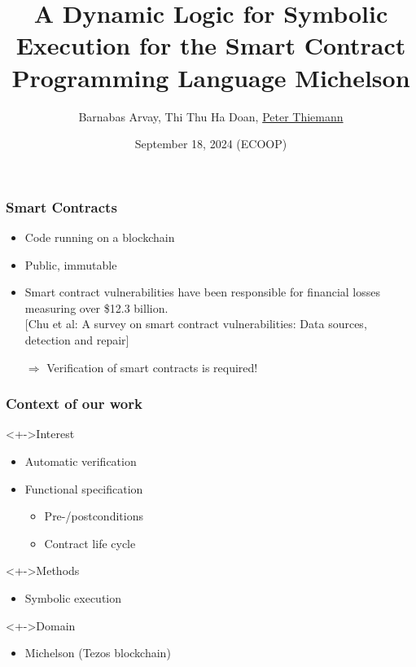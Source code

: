 \documentclass[aspectratio=1610]{beamer}
\title{A Dynamic Logic for Symbolic Execution for the Smart Contract Programming Language Michelson}
\author[Arvay, Doan, Thiemann]{Barnabas Arvay, Thi Thu Ha Doan, \underline{Peter Thiemann}}
\institute[]{University of Freiburg}
\date{September 18, 2024 (ECOOP)}
\begin{document}
\begin{frame}
  \titlepage
\end{frame}

\begin{frame}
  \frametitle{Smart Contracts}
  \begin{itemize}
  \item Code running on a blockchain
  \item Public, immutable
  \item Smart contract vulnerabilities have been responsible for financial losses measuring over \$12.3 billion. \\{}
    [Chu et al: A survey on smart contract vulnerabilities: Data sources, detection and repair]
  \item[$\Rightarrow$] Verification of smart contracts is required!
  \end{itemize}
\end{frame}
\begin{frame}
  \frametitle{Context of our work}
  \begin{block}<+->{Interest}
  \begin{itemize}
  \item Automatic verification
  \item Functional specification
    \begin{itemize}
    \item Pre-/postconditions
    \item Contract life cycle
    \end{itemize}
  \end{itemize}
\end{block}
\begin{block}<+->{Methods}
  \begin{itemize}
  \item Symbolic execution
  \end{itemize}
\end{block}
\begin{block}<+->{Domain}
  \begin{itemize}
  \item Michelson (Tezos blockchain)
  \end{itemize}
\end{block}
\end{frame}
\end{document}
